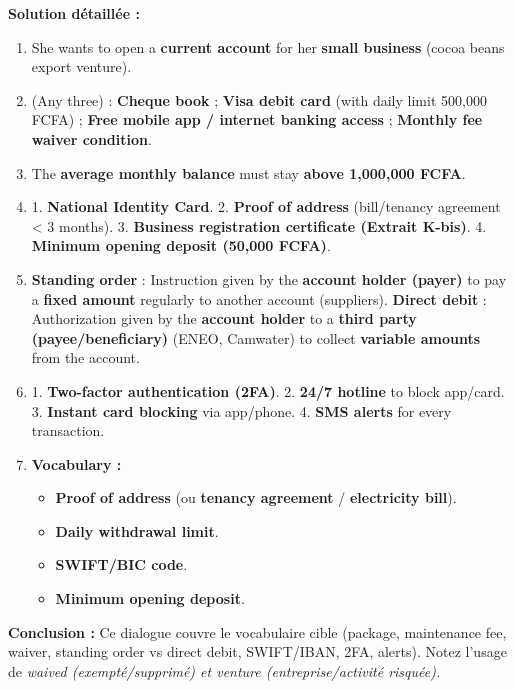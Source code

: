 \documentclass[11pt]{article}
\newcommand{\eng}[1]{\ifmmode\text{\textit{#1}}\else\begingroup\selectlanguage{english}\itshape #1\endgroup\fi}
\begin{document}
\begin{exoresolu}
    \tcblower
    \textbf{Solution détaillée :}
    \begin{enumerate}
        \item She wants to open a \textbf{current account} for her \textbf{small business} (cocoa beans export venture).
        \item (Any three) : \textbf{Cheque book} ; \textbf{Visa debit card} (with daily limit 500,000 FCFA) ; \textbf{Free mobile app / internet banking access} ; \textbf{Monthly fee waiver condition}.
        \item The \textbf{average monthly balance} must stay \textbf{above 1,000,000 FCFA}.
        \item 1. \textbf{National Identity Card}. 2. \textbf{Proof of address} (bill/tenancy agreement < 3 months). 3. \textbf{Business registration certificate (Extrait K-bis)}. 4. \textbf{Minimum opening deposit (50,000 FCFA)}.
        \item \textbf{Standing order} : Instruction given by the \textbf{account holder (payer)} to pay a \textbf{fixed amount} regularly to another account (suppliers). \textbf{Direct debit} : Authorization given by the \textbf{account holder} to a \textbf{third party (payee/beneficiary)} (ENEO, Camwater) to collect \textbf{variable amounts} from the account.
        \item 1. \textbf{Two-factor authentication (2FA)}. 2. \textbf{24/7 hotline} to block app/card. 3. \textbf{Instant card blocking} via app/phone. 4. \textbf{SMS alerts} for every transaction.
        \item \textbf{Vocabulary :}
        \begin{itemize}
            \item[a)] \textbf{Proof of address} (ou \textbf{tenancy agreement} / \textbf{electricity bill}).
            \item[b)] \textbf{Daily withdrawal limit}.
            \item[c)] \textbf{SWIFT/BIC code}.
            \item[d)] \textbf{Minimum opening deposit}.
        \end{itemize}
    \end{enumerate}
    \textbf{Conclusion :} Ce dialogue couvre le vocabulaire cible (package, maintenance fee, waiver, standing order vs direct debit, SWIFT/IBAN, 2FA, alerts). Notez l'usage de \eng{waived} (exempté/supprimé) et \eng{venture} (entreprise/activité risquée).
\end{exoresolu}
\end{document}
